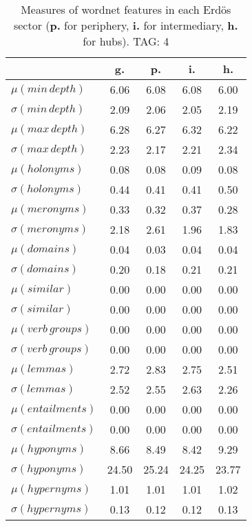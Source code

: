 \begin{table}[h!]
\begin{center}
\begin{tabular}{| l || c | c | c | c |}\hline
 & {\bf g.} & {\bf p.} & {\bf i.} & {\bf h.} \\\hline\hline
$\mu(min\,depth)$ & 6.06  & 6.08  & 6.08  & 6.00 \\
$\sigma(min\,depth)$ & 2.09  & 2.06  & 2.05  & 2.19 \\\hline
$\mu(max\,depth)$ & 6.28  & 6.27  & 6.32  & 6.22 \\
$\sigma(max\,depth)$ & 2.23  & 2.17  & 2.21  & 2.34 \\\hline
$\mu(holonyms)$ & 0.08  & 0.08  & 0.09  & 0.08 \\
$\sigma(holonyms)$ & 0.44  & 0.41  & 0.41  & 0.50 \\\hline
$\mu(meronyms)$ & 0.33  & 0.32  & 0.37  & 0.28 \\
$\sigma(meronyms)$ & 2.18  & 2.61  & 1.96  & 1.83 \\\hline
$\mu(domains)$ & 0.04  & 0.03  & 0.04  & 0.04 \\
$\sigma(domains)$ & 0.20  & 0.18  & 0.21  & 0.21 \\\hline
$\mu(similar)$ & 0.00  & 0.00  & 0.00  & 0.00 \\
$\sigma(similar)$ & 0.00  & 0.00  & 0.00  & 0.00 \\\hline
$\mu(verb\,groups)$ & 0.00  & 0.00  & 0.00  & 0.00 \\
$\sigma(verb\,groups)$ & 0.00  & 0.00  & 0.00  & 0.00 \\\hline
$\mu(lemmas)$ & 2.72  & 2.83  & 2.75  & 2.51 \\
$\sigma(lemmas)$ & 2.52  & 2.55  & 2.63  & 2.26 \\\hline
$\mu(entailments)$ & 0.00  & 0.00  & 0.00  & 0.00 \\
$\sigma(entailments)$ & 0.00  & 0.00  & 0.00  & 0.00 \\\hline
$\mu(hyponyms)$ & 8.66  & 8.49  & 8.42  & 9.29 \\
$\sigma(hyponyms)$ & 24.50  & 25.24  & 24.25  & 23.77 \\\hline
$\mu(hypernyms)$ & 1.01  & 1.01  & 1.01  & 1.02 \\
$\sigma(hypernyms)$ & 0.13  & 0.12  & 0.12  & 0.13 \\\hline
\end{tabular}
\caption{Measures of wordnet features in each Erd\"os sector ({{\bf p.}} for periphery, {{\bf i.}} for intermediary, {{\bf h.}} for hubs). TAG: 4}
\end{center}
\end{table}